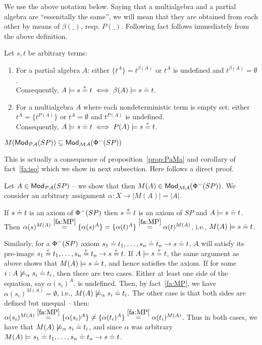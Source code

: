 \documentclass[10pt]{article}
\begin{document}
%
We use the above notation below. Saying that a multialgebra and a partial
algebra are ``essenitally the same'', we will
mean that they are obtained from each other by means of $\beta(\_)$,
resp. $P(\_)$.
Following fact follows immediately from the above definition.
\begin{fact}\label{fa:MP}
Let $s,t$ be arbitrary terms:
\begin{enumerate}\MyLPar
\item For a partial algebra $A$: either $\{t^A\}=t^{\beta(A)}$ or
$t^A$ is undefined and $t^{\beta(A)}=\emptyset$. \\
Consequently, $A\models s\stackrel{e}{=} t \iff \beta(A)\models s\mathrel{\dot{=} } t$.
\item For a multialgebra $A$ where each nondeterministic term is empty set:
either $t^A=\{t^{P(A)}\}$ or $t^A=\emptyset$ and $t^{P(A)}$ is undefined.\\
Consequently, $A\models s\mathrel{\dot{=} } t \iff P(A)\models s\stackrel{e}{=} t$.
\end{enumerate}
\end{fact}
%
\begin{proposition}\label{prop:subset}
$M({\sf {Mod}}_{{\mathcal{PA}}}(SP))\subseteq {\sf {Mod}}_{{\mathcal{MA}}}({\sf {\Phi}}^-(SP))$
\end{proposition}
\begin{PROOF} This is actually a consequence of proposition~\ref{prop:PaMa} and 
corollary of fact~\ref{fa:iso} which we show
in next subsection. Here follows a direct proof.

Let $A\in{\sf {Mod}}_{{\mathcal{PA}}}(SP)$ -- we show that then
$M(A)\in{\sf {Mod}}_{{\mathcal{MA}}}({\sf {\Phi}}^-(SP))$. We consider an arbitrary
assignment $\alpha:X\to |M(A)| = |A|$.

If $s\mathrel{\dot{=} } t$ is an axiom of ${\sf {\Phi}}^-(SP)$ then $s\stackrel{e}{=}
t$ is an axiom of $SP$ and $A\models s\mathrel{\dot{=} } t$. 
Then $\alpha(s)^{M(A)} \stackrel{\ref{fa:MP}}{=} \{\alpha(s)^{A}\} = \{\alpha(t)^{A}\}
\stackrel{\ref{fa:MP}}{=} \alpha(t)^{M(A)}$, i.e., $M(A)\models s\mathrel{\dot{=} } t$. 

Similarly, for a ${\sf {\Phi}}^-(SP)$ axiom $s_1\mathrel{\dot{=} } t_1,\ldots,s_n\mathrel{\dot{=} } t_n\to
s\mathrel{\dot{=} } t$, $A$ will satisfy its pre-image $s_1\stackrel{e}{=} t_1,\ldots,s_n\stackrel{e}{=} t_n\to
s\stackrel{e}{=} t$. If $A\models s\stackrel{e}{=} t$, the same argument as above shows that
$M(A)\models s\mathrel{\dot{=} } t$, and hence satisfies the axiom.  If for some
$i:A\not\models_\alpha s_i\mathrel{\dot{=} } t_i$, then there are two cases. Either at
least one side of the equation, say $\alpha(s_i)^A$, is
undefined. Then, by fact~\ref{fa:MP}, we have $\alpha(s_i)^{M(A)}=\emptyset$, 
i.e., $M(A)\not\models_\alpha s_i\mathrel{\dot{=} } t_i$. The other case
is that both sides are defined but unequal -- then:
$\alpha(s_i)^{M(A)}\stackrel{\ref{fa:MP}}{=}\{\alpha(s_i)^A\}\not=
\{\alpha(t_i)^A\}\stackrel{\ref{fa:MP}}{=}\alpha(t_i)^{M(A)}$.
Thus in both cases, we have that $M(A)\not\models_\alpha s_i\mathrel{\dot{=} } t_i$, and
since $\alpha$ was arbitrary
$M(A)\models s_1\mathrel{\dot{=} } t_1,\ldots,s_n\mathrel{\dot{=} } t_n\to s\mathrel{\dot{=} } t$.
\end{PROOF}
\end{document}
